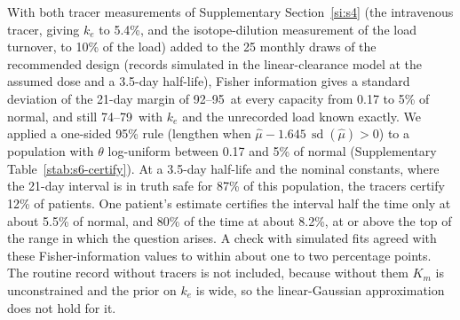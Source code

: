 With both tracer measurements of Supplementary Section~\ref{si:s4} (the intravenous tracer, giving
$k_e$ to 5.4\%, and the isotope-dilution measurement of the load turnover, to 10\% of the load)
added to the 25 monthly draws of the recommended design (records simulated in the
linear-clearance model at the assumed dose and a 3.5-day half-life), Fisher information gives a
standard deviation of the 21-day margin of 92--95\um\ at every capacity from 0.17 to 5\% of normal, and still
74--79\um\ with $k_e$ and the unrecorded load known exactly. We applied a one-sided 95\% rule
(lengthen when $\hat\mu-1.645\,\operatorname{sd}(\hat\mu)>0$) to a population with $\theta$
log-uniform between 0.17 and 5\% of normal (Supplementary Table~\ref{stab:s6-certify}). At a
3.5-day half-life and the nominal constants, where the 21-day interval is in truth safe for 87\% of
this population, the tracers certify 12\% of patients. One patient's estimate certifies the
interval half the time only at about 5.5\% of normal, and 80\% of the time at about 8.2\%, at or
above the top of the range in which the question arises. A check with simulated fits agreed with
these Fisher-information values to within about one to two percentage points. The routine record
without tracers is not included, because without them $K_m$ is unconstrained and the prior on
$k_e$ is wide, so the linear-Gaussian approximation does not hold for it.


